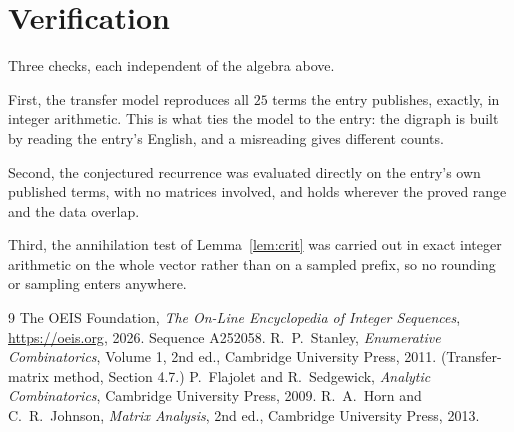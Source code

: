 \documentclass[11pt,a4paper]{article}
\theoremstyle{plain}
\theoremstyle{definition}
\begin{document}
\section{Verification}

Three checks, each independent of the algebra above.

First, the transfer model reproduces all $25$ terms the entry publishes, exactly, in
integer arithmetic. This is what ties the model to the entry: the digraph is built by reading
the entry's English, and a misreading gives different counts.

Second, the conjectured recurrence was evaluated directly on the entry's own published terms,
with no matrices involved, and holds wherever the proved range and the data overlap.

Third, the annihilation test of Lemma~\ref{lem:crit} was carried out in exact integer
arithmetic on the whole vector rather than on a sampled prefix, so no rounding or sampling
enters anywhere.

\begin{thebibliography}{9}
 The OEIS Foundation, \emph{The On-Line Encyclopedia of Integer
Sequences}, \url{https://oeis.org}, 2026. Sequence A252058.
 R.~P.~Stanley, \emph{Enumerative Combinatorics}, Volume 1, 2nd ed.,
Cambridge University Press, 2011. (Transfer-matrix method, Section 4.7.)
 P.~Flajolet and R.~Sedgewick, \emph{Analytic Combinatorics}, Cambridge
University Press, 2009.
 R.~A.~Horn and C.~R.~Johnson, \emph{Matrix Analysis}, 2nd ed., Cambridge
University Press, 2013.
\end{thebibliography}
\end{document}
